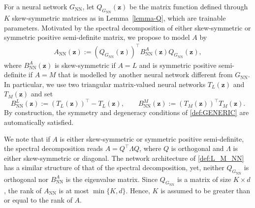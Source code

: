 \documentclass[openacc]{rsproca_new}%
\newcommand{\z}{\bm{z}}
\begin{document}
For a neural network $G_{\text{NN}}$,
let $Q_{G_{\text{NN}}}(\z)$
be the matrix function defined through 
$K$ skew-symmetric matrices as in Lemma~\ref{lemma-Q},
which are trainable parameters.
Motivated by the spectral decomposition of 
either skew-symmetric or symmetric positive semi-definite
matrix,
we propose to model $A$ by 
\begin{equation} \label{def:L_M_NN}
    \begin{split}
        A_{\text{NN}}(\z) := (Q_{G_{\text{NN}}}(\z))^\top B_{\text{NN}}^A(\z)
        Q_{G_{\text{NN}}}(\z),
    \end{split}
\end{equation}
where $B_{\text{NN}}^A(\z)$ is skew-symmetric if $A= L$ 
and is symmetric positive semi-definite if $A = M$
that is modelled by another neural network 
different from $G_{\text{NN}}$.
In particular, 
we use two triangular matrix-valued neural networks $T_L(\z)$ and $T_M(\z)$ and set 
\begin{equation} \label{def:T_M}
    B_{\text{NN}}^L(\z) := (T_L(\z))^\top - T_L(\z),
    \qquad
    B_{\text{NN}}^M(\z) := (T_M(\z))^\top T_M(\z).
\end{equation}
By construction,
the symmetry and degeneracy conditions of \eqref{def:GENERIC} are automatically satisfied. 


We note that 
if $A$ is either skew-symmetric or symmetric positive semi-definite, 
the spectral decomposition reads 
$A = Q^\top \Lambda Q$,
where $Q$ is orthogonal and $\Lambda$
is either skew-symmetric or diagonal.
The network architecture of \eqref{def:L_M_NN}
has a similar structure of that of 
the spectral decomposition,
yet, 
neither $Q_{G_{\text{NN}}}$ is orthogonal
nor $B_{\text{NN}}^A$ is the eigenvalue matrix.
Since $Q_{G_{\text{NN}}}$ is a matrix of size $K\times d$,
the rank of $A_{\text{NN}}$ is at most $\min\{K,d\}$.
Hence, $K$ is assumed to be greater than or equal to 
the rank of $A$.
\end{document}
